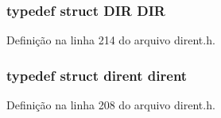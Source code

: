 \subsubsection[{D\+IR}]{\setlength{\rightskip}{0pt plus 5cm}typedef struct {\bf D\+IR} {\bf D\+IR}}\label{dirent_8h_a805632179a707f8794b35f089c940cb3}


Definição na linha 214 do arquivo dirent.\+h.

\subsubsection[{dirent}]{\setlength{\rightskip}{0pt plus 5cm}typedef struct {\bf dirent} {\bf dirent}}\label{dirent_8h_ae50c911db67dfb4b55fbfc97a557f6f2}


Definição na linha 208 do arquivo dirent.\+h.

